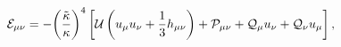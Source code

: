 \begin{equation}
{{\mathcal{E}}_{\mu\nu}}=-{{\left({{\tilde{\kappa}}\over{\kappa}}\right)}^4}
\left[{\mathcal{U}}
\left({u_\mu}{u_\nu}+{1\over{3}}{h_{\mu\nu}}\right)+{{\mathcal{P}}_{\mu\nu}}+{{\mathcal{Q}}_\mu}{u_\nu}+
{{\mathcal{Q}}_\nu}{u_\mu}\right],
\end{equation}

